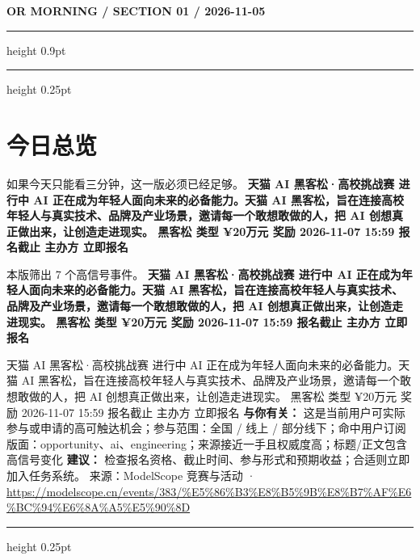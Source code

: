 \documentclass[10.5pt]{ctexart}
\begin{document}
{\small\bfseries OR MORNING / SECTION 01 / 2026-11-05}
\vspace{2mm}
\hrule height 0.9pt
\vspace{1.5mm}
\hrule height 0.25pt
\vspace{4mm}
\section*{今日总览}
{\color{ormuted} 如果今天只能看三分钟，这一版必须已经足够。}
\vspace{2mm}
{\fontsize{25}{29}\selectfont\bfseries 天猫 AI 黑客松·高校挑战赛 进行中 AI 正在成为年轻人面向未来的必备能力。天猫 AI 黑客松，旨在连接高校年轻人与真实技术、品牌及产业场景，邀请每一个敢想敢做的人，把 AI 创想真正做出来，让创造走进现实。 黑客松 类型 ¥20万元 奖励 2026-11-07 15:59 报名截止 主办方 立即报名}\par
\vspace{2mm}
{\large 本版筛出 7 个高信号事件。}
\vspace{3mm}
{\Large\bfseries 天猫 AI 黑客松·高校挑战赛 进行中 AI 正在成为年轻人面向未来的必备能力。天猫 AI 黑客松，旨在连接高校年轻人与真实技术、品牌及产业场景，邀请每一个敢想敢做的人，把 AI 创想真正做出来，让创造走进现实。 黑客松 类型 ¥20万元 奖励 2026-11-07 15:59 报名截止 主办方 立即报名}\par
天猫 AI 黑客松·高校挑战赛 进行中 AI 正在成为年轻人面向未来的必备能力。天猫 AI 黑客松，旨在连接高校年轻人与真实技术、品牌及产业场景，邀请每一个敢想敢做的人，把 AI 创想真正做出来，让创造走进现实。 黑客松 类型 ¥20万元 奖励 2026-11-07 15:59 报名截止 主办方 立即报名
\textbf{与你有关：} 这是当前用户可实际参与或申请的高可触达机会；参与范围：全国 / 线上 / 部分线下；命中用户订阅版面：opportunity、ai、engineering；来源接近一手且权威度高；标题/正文包含高信号变化
\textbf{建议：} 检查报名资格、截止时间、参与形式和预期收益；合适则立即加入任务系统。
{\footnotesize\color{ormuted} 来源：ModelScope 竞赛与活动 · \url{https://modelscope.cn/events/383/%E5%86%B3%E8%B5%9B%E8%B7%AF%E6%BC%94%E6%8A%A5%E5%90%8D}}
\vspace{3mm}
\hrule height 0.25pt
\vspace{3mm}
\end{document}
